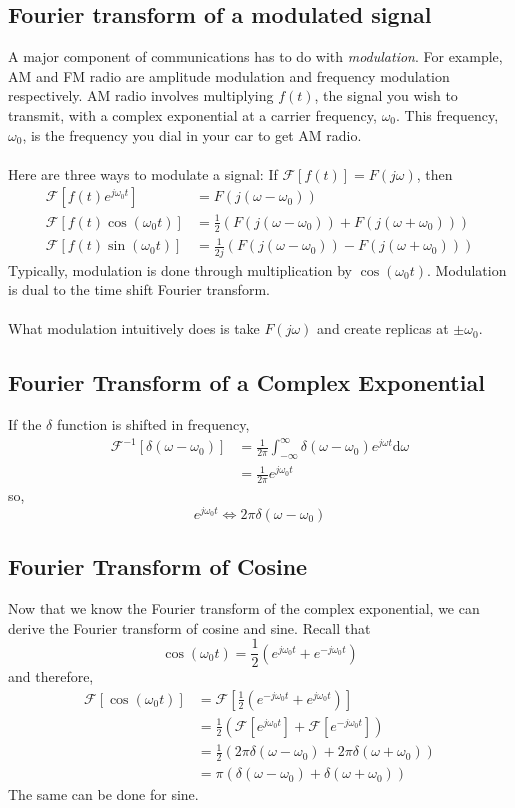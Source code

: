 \documentclass[10pt]{article}
\newcommand{\llra}{\Longleftrightarrow}
\newcommand{\fourier}{\mathcal{F}}
\newcommand{\absint}{\int_{-\infty}^\infty}
\newcommand{\dd}{\text{d}}
\begin{document}
\subsection*{Fourier transform of a modulated signal}
A major component of communications has to do with \textit{modulation}.  For example, AM and FM radio are amplitude modulation and frequency modulation respectively.  AM radio involves multiplying $f(t)$, the signal you wish to transmit, with a complex exponential at a carrier frequency, $\omega_0$.  This frequency, $\omega_0$, is the frequency you dial in your car to get AM radio.\\\\
Here are three ways to modulate a signal: If $\fourier[f(t)] = F(j\omega)$, then
\begin{align*}
    \fourier[f(t) e^{j\omega_0 t}] &= F(j(\omega - \omega_0))\\
    \fourier[f(t) \cos(\omega_0 t)] &= \frac{1}{2}(F(j(\omega - \omega_0)) + F(j(\omega + \omega_0)))\\
    \fourier[f(t) \sin(\omega_0 t)] &= \frac{1}{2j} (F(j(\omega - \omega_0)) - F(j(\omega + \omega_0)))
\end{align*}
Typically, modulation is done through multiplication by $\cos(\omega_0 t)$.  Modulation is dual to the time shift Fourier transform.\\\\
What modulation intuitively does is take $F(j\omega)$ and create replicas at $\pm \omega_0$.

\subsection*{Fourier Transform of a Complex Exponential}
If the $\delta$ function is shifted in frequency,
\begin{align*}
    \fourier^{-1}[\delta(\omega - \omega_0)] &= \frac{1}{2\pi} \absint \delta(\omega - \omega_0) e^{j\omega t} \dd \omega\\
    &= \frac{1}{2\pi} e^{j\omega_0 t}
\end{align*}
so,
\[\boxed{e^{j\omega_0 t} \llra 2\pi \delta(\omega - \omega_0)}\]

\subsection*{Fourier Transform of Cosine}
Now that we know the Fourier transform of the complex exponential, we can derive the Fourier transform of cosine and sine.  Recall that
\[\cos(\omega_0 t) = \frac{1}{2} \left(e^{j\omega_0 t} + e^{-j\omega_0 t}\right)\]
and therefore,
\begin{align*}
    \fourier[\cos(\omega_0 t)] &= \fourier\left[\frac{1}{2} \left(e^{-j\omega_0 t} + e^{j\omega_0 t}\right)\right]\\
    &= \frac{1}{2} \left(\fourier\left[e^{j\omega_0 t}\right] + \fourier\left[e^{-j\omega_0 t}\right]\right)\\
    &= \frac{1}{2} (2\pi \delta(\omega - \omega_0) + 2\pi \delta(\omega + \omega_0))\\
    &= \pi(\delta(\omega - \omega_0) + \delta(\omega + \omega_0))
\end{align*}
The same can be done for sine.
\end{document}
